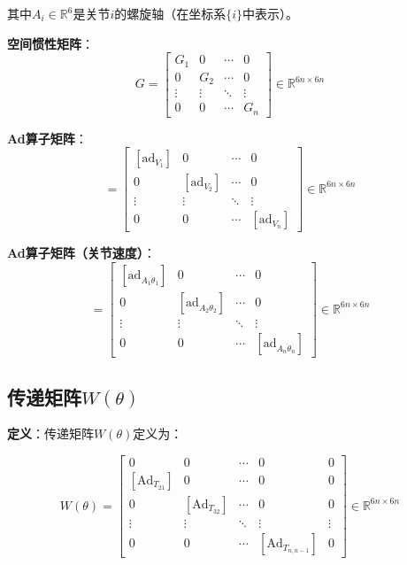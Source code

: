 \documentclass[12pt,a4paper]{article}
\begin{document}
其中$A_i \in \mathbb{R}^6$是关节$i$的螺旋轴（在坐标系$\{i\}$中表示）。

\textbf{空间惯性矩阵}：
\begin{equation}
G = \begin{bmatrix}
G_1 & 0 & \cdots & 0 \\
0 & G_2 & \cdots & 0 \\
\vdots & \vdots & \ddots & \vdots \\
0 & 0 & \cdots & G_n
\end{bmatrix} \in \mathbb{R}^{6n \times 6n}
\label{eq:matrix_G}
\end{equation}

\textbf{Ad算子矩阵}：
\begin{equation}
[\text{ad}_V] = \begin{bmatrix}
[\text{ad}_{V_1}] & 0 & \cdots & 0 \\
0 & [\text{ad}_{V_2}] & \cdots & 0 \\
\vdots & \vdots & \ddots & \vdots \\
0 & 0 & \cdots & [\text{ad}_{V_n}]
\end{bmatrix} \in \mathbb{R}^{6n \times 6n}
\label{eq:matrix_ad_V}
\end{equation}

\textbf{Ad算子矩阵（关节速度）}：
\begin{equation}
[\text{ad}_{A\dot{\theta}}] = \begin{bmatrix}
[\text{ad}_{A_1\dot{\theta}_1}] & 0 & \cdots & 0 \\
0 & [\text{ad}_{A_2\dot{\theta}_2}] & \cdots & 0 \\
\vdots & \vdots & \ddots & \vdots \\
0 & 0 & \cdots & [\text{ad}_{A_n\dot{\theta}_n}]
\end{bmatrix} \in \mathbb{R}^{6n \times 6n}
\label{eq:matrix_ad_A_theta_dot}
\end{equation}

\subsection{传递矩阵$W(\theta)$}

\textbf{定义}：传递矩阵$W(\theta)$定义为：

\begin{equation}
W(\theta) = \begin{bmatrix}
0 & 0 & \cdots & 0 & 0 \\
[\text{Ad}_{T_{21}}] & 0 & \cdots & 0 & 0 \\
0 & [\text{Ad}_{T_{32}}] & \cdots & 0 & 0 \\
\vdots & \vdots & \ddots & \vdots & \vdots \\
0 & 0 & \cdots & [\text{Ad}_{T_{n,n-1}}] & 0
\end{bmatrix} \in \mathbb{R}^{6n \times 6n}
\label{eq:matrix_W}
\end{equation}
\end{document}
